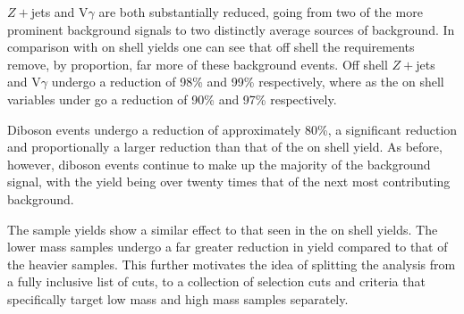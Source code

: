 $Z+$jets and V$\gamma$ are both substantially reduced, going from two of the more prominent background signals to two distinctly average sources of background.
In comparison with on shell yields one can see that off shell the requirements remove, by proportion, far more of these background events.
Off shell $Z+$jets and V$\gamma$ undergo a reduction of 98\% and 99\% respectively, where as the on shell variables under go a reduction of 90\% and 97\% respectively.

Diboson events undergo a reduction of approximately 80\%, a significant reduction and proportionally a larger reduction than that of the on shell yield.
As before, however, diboson events continue to make up the majority of the background signal, with the yield being over twenty times that of the next most contributing background.

The sample yields show a similar effect to that seen in the on shell yields.
The lower mass samples undergo a far greater reduction in yield compared to that of the heavier samples.
This further motivates the idea of splitting the analysis from a fully inclusive list of cuts, to a collection of selection cuts and criteria that specifically target low mass and high mass samples separately. 
